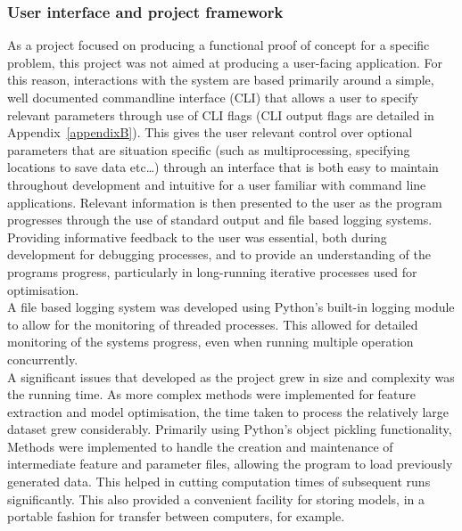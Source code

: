 \documentclass[titlepage, 12pt]{scrartcl} \usepackage{enumitem}
\begin{document}
\subsubsection{User interface and project framework}
As a project focused on producing a functional proof of concept for a specific
problem, this project was not aimed at producing a user-facing application. For
this reason, interactions with the system are based primarily around a simple,
well documented commandline interface (CLI) that allows a user to specify
relevant parameters through use of CLI flags (CLI output flags are detailed in
Appendix~\ref{appendixB}). This gives the user relevant
control over optional parameters that are situation specific (such as
multiprocessing, specifying locations to save data etc\ldots) through an interface that is both easy to maintain throughout
development and intuitive for a user familiar with command line applications.
Relevant information is then presented to the user as the program progresses
through the use of standard output and file based logging systems. Providing
informative feedback to the user was essential, both during development for
debugging processes, and to provide an understanding of the programs progress,
particularly in long-running iterative processes used for optimisation.\\
A file based logging system was developed using Python's built-in logging
module to allow for the monitoring of threaded processes. This allowed for
detailed monitoring of the systems progress, even when running multiple
operation concurrently.\\

A significant issues that developed as the project grew in size and complexity
was the running time. As more complex methods were implemented for feature
extraction and model optimisation, the time taken to process the relatively
large dataset grew considerably. Primarily using Python's object pickling
functionality, Methods were implemented to handle the creation and maintenance
of intermediate feature and parameter files, allowing the program to load
previously generated data. This helped in cutting  computation times of
subsequent runs significantly. This also provided a convenient facility for
storing models, in a portable fashion for transfer between computers, for
example.
\end{document}
